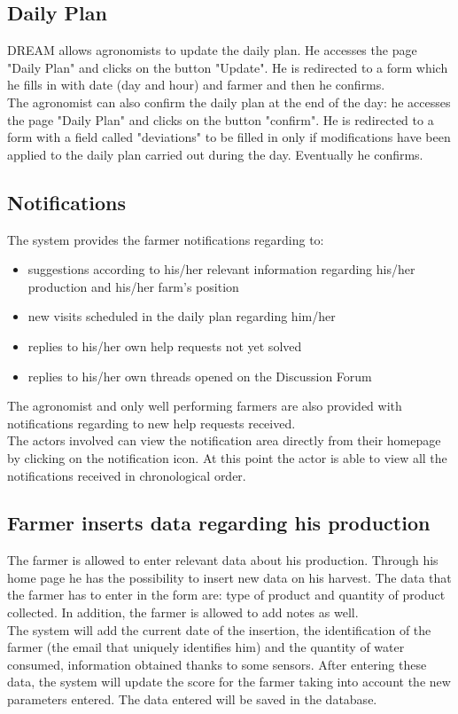 \subsection{Daily Plan}
DREAM allows agronomists to update the daily plan. He accesses the page "Daily Plan" and clicks on the button "Update". He is redirected to a form which he fills in with date (day and hour) and farmer and then he confirms. \\
The agronomist can also confirm the daily plan at the end of the day: he accesses the page "Daily Plan" and clicks on the button "confirm". He is redirected to a form with a field called "deviations" to be filled in only if modifications have been applied to the daily plan carried out during the day. Eventually he confirms.

\subsection{Notifications}
The system provides the farmer notifications regarding to: 
\begin{itemize}
    \item suggestions according to  his/her relevant information regarding his/her production and his/her farm's position
    \item new visits scheduled in the daily plan regarding him/her
    \item replies to his/her own help requests not yet solved
    \item replies to his/her own threads opened on the Discussion Forum
\end{itemize}
The agronomist and only well performing farmers are also provided with notifications regarding to new help requests received.\\

The actors involved can view the notification area directly from their homepage by clicking on the notification icon. At this point the actor is able to view all the notifications received in chronological order.

\subsection{Farmer inserts data regarding his production}
The farmer is allowed to enter relevant data about his production. Through his home page he has the possibility to insert new data on his harvest.
The data that the farmer has to enter in the form are: type of product and quantity of product collected. In addition, the farmer is allowed to add notes as well.\\
The system will add the current date of the insertion, the identification of the farmer (the email that uniquely identifies him) and the quantity of water consumed, information obtained thanks to some sensors.
After entering these data, the system will update the score for the farmer taking into account the new parameters entered.
The data entered will be saved in the database.

